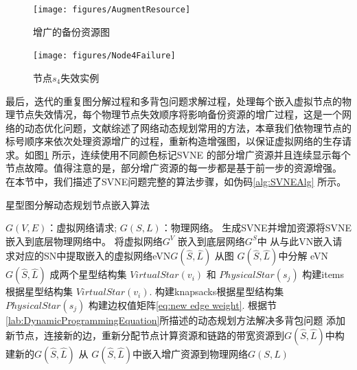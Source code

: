 \begin{figure}[htb]
\centering
\begin{minipage}{0.4\textwidth}
\centering
\texttt{[image: figures/AugmentResource]}
\caption{增广的备份资源图}\label{fig:AugmentResource}
\end{minipage}
\begin{minipage}{0.4\textwidth}
\centering
\texttt{[image: figures/Node4Failure]}
\caption{节点$s_4$失效实例}\label{fig:Node4Failure}
\end{minipage}\vspace{\baselineskip}
\end{figure}

最后，迭代的重复图分解过程和多背包问题求解过程，处理每个嵌入虚拟节点的物理节点失效情况，每个物理节点失效顺序将影响备份资源的增广过程，这是一个网络的动态优化问题，文献综述了网络动态规划常用的方法，本章我们依物理节点的标号顺序来依次处理资源增广的过程，重新构造增强图，以保证虚拟网络的生存请求。如图\ref{fig:Node4Failure} 所示，连续使用不同颜色标记SVNE 的部分增广资源并且连续显示每个节点故障。值得注意的是，部分增广资源的每一步都是基于前一步的资源增强。
在本节中，我们描述了SVNE问题完整的算法步骤，如伪码\ref{alg:SVNEAlg} 所示。
\begin{algorithm}[htb]
\label{alg:SVNEAlg}
\caption{星型图分解动态规划节点嵌入算法}
\begin{algorithmic}[1]
\REQUIRE $G (V,E)$：虚拟网络请求; $G (S,L)$：物理网络。
\ENSURE 生成SVNE并增加资源将SVNE嵌入到底层物理网络中。
\STATE 将虚拟网络$G^V$ 嵌入\cite{liu2011completing}到底层网络$G^S$中
\STATE 从与此VN嵌入请求对应的SN中提取嵌入的虚拟网络eVN$G\left( {\hat S,\hat L} \right)$
\STATE  从图 $G\left( {\hat S,\hat L} \right)$中分解 eVN $G\left( {\hat S,\hat L} \right)$ 成两个星型结构集 $VirtualStar(v_i)$ 和 $PhysicalStar(s_j)$
\STATE 构建items根据星型结构集 $VirtualStar(v_i)$.
\STATE 构建knapsacks根据星型结构集$PhysicalStar(s_j)$
\STATE 构建边权值矩阵\ref{eq:new edge weight}.
\STATE 根据节\ref{lab:DynamicProgrammingEquation}所描述的动态规划方法解决多背包问题
\STATE 添加新节点，连接新的边，重新分配节点计算资源和链路的带宽资源到$G\left( {\hat S,\hat L} \right)$中构建新的$G\left( {\hat S,\hat L} \right)$
\ENDFOR
\STATE 从 $G\left( {\hat S,\hat L} \right)$中嵌入增广资源到物理网络$G(S,L)$
\end{algorithmic}
\end{algorithm}
